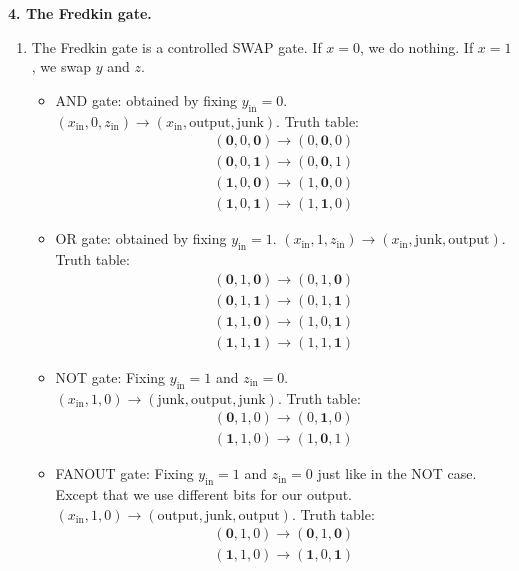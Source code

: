 \documentclass{article}
\theoremstyle{definition}
\begin{document}
\noindent \textbf{4. The Fredkin gate.}

\begin{enumerate}[label=(\alph*)]
	\item The Fredkin gate is a controlled SWAP gate. If $x=0$, we do nothing. If $x=1$, we swap $y$ and $z$. 
	\begin{itemize}
		\item AND gate: obtained by fixing $y_\text{in}=0$. $(x_\text{in},0,z_\text{in}) \to (x_\text{in},\text{output}, \text{junk})$. Truth table:
		\begin{align*}
			(\mathbf{0},0,\mathbf{0}) \to (0,\mathbf{0},0)\\
			(\mathbf{0},0,\mathbf{1}) \to (0,\mathbf{0},1)\\
			(\mathbf{1},0,\mathbf{0}) \to (1,\mathbf{0},0)\\
			(\mathbf{1},0,\mathbf{1}) \to (1,\mathbf{1},0)
		\end{align*}
		\item OR gate: obtained by fixing $y_\text{in}=1$. $(x_\text{in},1,z_\text{in}) \to (x_\text{in},\text{junk}, \text{output})$. Truth table:
		\begin{align*}
			(\mathbf{0},1,\mathbf{0}) \to (0,{1},\mathbf{0})\\
			(\mathbf{0},1,\mathbf{1}) \to (0,{1},\mathbf{1})\\
			(\mathbf{1},1,\mathbf{0}) \to (1,{0},\mathbf{1})\\
			(\mathbf{1},1,\mathbf{1}) \to (1,{1},\mathbf{1})
		\end{align*}
		\item NOT gate:  Fixing $y_\text{in}=1$ and $z_\text{in}=0$. $(x_\text{in},1,0) \to (\text{junk},\text{output}, \text{junk})$. Truth table:
		\begin{align*}
			(\mathbf{0},{1},{0}) \to (0,\mathbf{1},{0})\\
			(\mathbf{1},{1},{0}) \to (1,\mathbf{0},{1})
		\end{align*}
		
		\item FANOUT gate: Fixing $y_\text{in}=1$ and $z_\text{in}=0$ just like in the NOT case. Except that we use different bits for our output.  $(x_\text{in},1,0) \to (\text{output},\text{junk}, \text{output})$. Truth table:
		\begin{align*}
			(\mathbf{0},{1},{0}) \to (\mathbf{0},{1},\mathbf{0})\\
			(\mathbf{1},{1},{0}) \to (\mathbf{1},{0},\mathbf{1})
		\end{align*}
	\end{itemize}


\end{enumerate}
\end{document}
